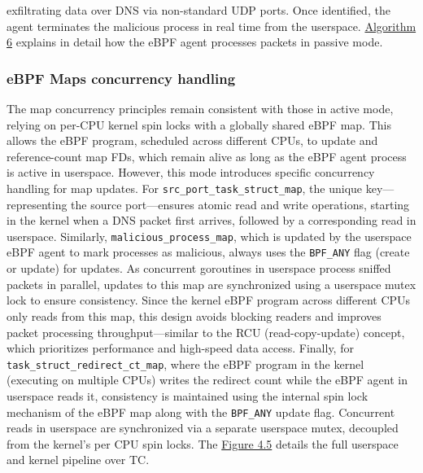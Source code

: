 \documentclass [11pt, proquest] {uwthesis}[2020/02/24]
\begin{document}
exfiltrating data over DNS via non-standard UDP ports. Once identified, the agent terminates the malicious process in real time from the userspace. \hyperref[sec:alg6]{Algorithm 6} explains in detail how the eBPF agent processes packets in passive mode.

\subsubsection{\textbf{eBPF Maps concurrency handling}}
\label{passive:sec3}
The map concurrency principles remain consistent with those in active mode, relying on per-CPU kernel spin locks with a globally shared eBPF map. This allows the eBPF program, scheduled across different CPUs, to update and reference-count map FDs, which remain alive as long as the eBPF agent process is active in userspace. However, this mode introduces specific concurrency handling for map updates. For \texttt{src\_port\_task\_struct\_map}, the unique key—representing the source port—ensures atomic read and write operations, starting in the kernel when a DNS packet first arrives, followed by a corresponding read in userspace. Similarly, \texttt{malicious\_process\_map}, which is updated by the userspace eBPF agent to mark processes as malicious, always uses the \texttt{BPF\_ANY} flag (create or update) for updates. As concurrent goroutines in userspace process sniffed packets in parallel, updates to this map are synchronized using a userspace mutex lock to ensure consistency. Since the kernel eBPF program across different CPUs only reads from this map, this design avoids blocking readers and improves packet processing throughput—similar to the RCU (read-copy-update) concept, which prioritizes performance and high-speed data access. Finally, for \texttt{task\_struct\_redirect\_ct\_map}, where the eBPF program in the kernel (executing on multiple CPUs) writes the redirect count while the eBPF agent in userspace reads it, consistency is maintained using the internal spin lock mechanism of the eBPF map along with the \texttt{BPF\_ANY} update flag. Concurrent reads in userspace are synchronized via a separate userspace mutex, decoupled from the kernel's per CPU spin locks. The \hyperref[sec:dp-passive-phase]{Figure 4.5} details the full userspace and kernel pipeline over TC. 
\end{document}
